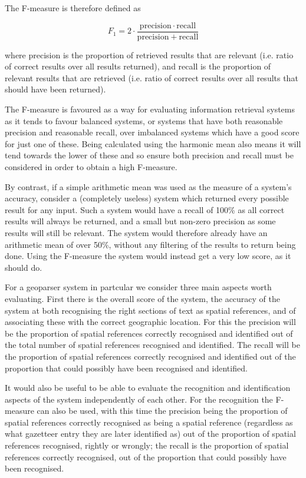 \documentclass[12pt, a4paper]{report}
\begin{document}
The F-measure is therefore defined as

\begin{displaymath}
	F_{1} = 2 \cdot \frac{\mathrm{precision} \cdot \mathrm{recall}}{\mathrm{precision} + \mathrm{recall}}
\end{displaymath}

where precision is the proportion of retrieved results that are relevant (i.e. ratio of correct results over all results returned), and recall is the proportion of relevant results that are retrieved (i.e. ratio of correct results over all results that should have been returned).

The F-measure is favoured as a way for evaluating information retrieval systems as it tends to favour balanced systems, or systems that have both reasonable precision and reasonable recall, over imbalanced systems which have a good score for just one of these. Being calculated using the harmonic mean also means it will tend towards the lower of these and so ensure both precision and recall must be considered in order to obtain a high F-measure.

By contrast, if a simple arithmetic mean was used as the measure of a system's accuracy, consider a (completely useless) system which returned every possible result for any input. Such a system would have a recall of 100\% as all correct results will always be returned, and a small but non-zero precision as some results will still be relevant. The system would therefore already have an arithmetic mean of over 50\%, without any filtering of the results to return being done. Using the F-measure the system would instead get a very low score, as it should do.

For a geoparser system in partcular we consider three main aspects worth evaluating. First there is the overall score of the system, the accuracy of the system at both recognising the right sections of text as spatial references, and of associating these with the correct geographic location. For this the precision will be the proportion of spatial references correctly recognised and identified out of the total number of spatial references recognised and identified. The recall will be the proportion of spatial references correctly recognised and identified out of the proportion that could possibly have been recognised and identified.

It would also be useful to be able to evaluate the recognition and identification aspects of the system independently of each other. For the recognition the F-measure can also be used, with this time the precision being the proportion of spatial references correctly recognised as being a spatial reference (regardless as what gazetteer entry they are later identified as) out of the proportion of spatial references recognised, rightly or wrongly; the recall is the proportion of spatial references correctly recognised, out of the proportion that could possibly have been recognised.
\end{document}
